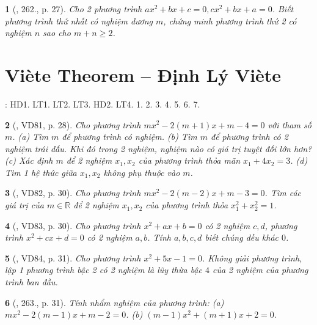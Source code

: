 \documentclass{article}
\newtheorem{baitoan}{}
\begin{document}
\begin{baitoan}[\cite{Binh_Toan_9_tap_2}, 262., p. 27]
	Cho 2 phương trình $ax^2 + bx + c = 0,cx^2 + bx + a = 0$. Biết phương trình thứ nhất có nghiệm dương $m$, chứng minh phương trình thứ 2 có nghiệm $n$ sao cho $m + n\ge2$.
\end{baitoan}


\section{Vi\`ete Theorem -- Định Lý Vi\`ete}
\cite[Chap. VII, \S3, pp. 61--65]{SGK_Toan_9_Canh_Dieu_tap_2}: HD1. LT1. LT2. LT3. HD2. LT4. 1. 2. 3. 4. 5. 6. 7.

\begin{baitoan}[\cite{Binh_Toan_9_tap_2}, VD81, p. 28]
	Cho phương trình $mx^2 - 2(m + 1)x + m - 4 = 0$ với tham số $m$. (a) Tìm $m$ để phương trình có nghiệm. (b) Tìm $m$ để phương trình có 2 nghiệm trái dấu. Khi đó trong 2 nghiệm, nghiệm nào có giá trị tuyệt đối lớn hơn? (c) Xác định $m$ để 2 nghiệm $x_1,x_2$ của phương trình thỏa mãn $x_1 + 4x_2 = 3$. (d) Tìm 1 hệ thức giữa $x_1,x_2$ không phụ thuộc vào $m$.
\end{baitoan}

\begin{baitoan}[\cite{Binh_Toan_9_tap_2}, VD82, p. 30]
	Cho phương trình $mx^2 - 2(m - 2)x + m - 3 = 0$. Tìm các giá trị của $m\in\mathbb{R}$ để 2 nghiệm $x_1,x_2$ của phương trình thỏa $x_1^2 + x_2^2 = 1$.
\end{baitoan}

\begin{baitoan}[\cite{Binh_Toan_9_tap_2}, VD83, p. 30]
	Cho phương trình $x^2 + ax + b = 0$ có 2 nghiệm $c,d$, phương trình $x^2 + cx + d = 0$ có 2 nghiệm $a,b$. Tính $a,b,c,d$ biết chúng đều khác $0$.
\end{baitoan}

\begin{baitoan}[\cite{Binh_Toan_9_tap_2}, VD84, p. 31]
	Cho phương trình $x^2 + 5x - 1 = 0$. Không giải phương trình, lập 1 phương trình bậc 2 có 2 nghiệm là lũy thừa bậc $4$ của 2 nghiệm của phương trình ban đầu.
\end{baitoan}

\begin{baitoan}[\cite{Binh_Toan_9_tap_2}, 263., p. 31]
	Tính nhẩm nghiệm của phương trình: (a) $mx^2 - 2(m - 1)x + m - 2 = 0$. (b) $(m - 1)x^2 + (m + 1)x + 2 = 0$.
\end{baitoan}
\end{document}
